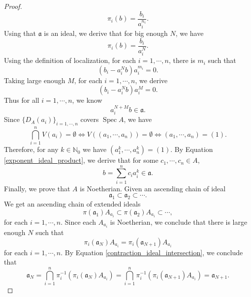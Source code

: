 \documentclass{article}
\numberwithin{equation}{section}
\DeclareMathOperator{\Spec}{Spec}
\begin{document}
\begin{proof}
\begin{equation*}
\pi_i(b) = {\frac {b_i} {a_i^{n_i}}}.
\end{equation*}
Using that $\mathfrak{a}$ is an ideal, we derive that for big enough $N$, we have
\begin{equation*}
\pi_i(b) = {\frac {b_i} {a_i^{N}}}.
\end{equation*}
Using the definition of localization, for each $i=1,\cdots,n$, there is $m_i$ such that
\begin{equation*}
(b_i-a_i^Nb)a_i^{m_i}=0.
\end{equation*}
Taking large enough $M$, for each $i=1,\cdots,n$, we derive
\begin{equation*}
(b_i-a_i^Nb)a_i^{M}=0.
\end{equation*}
Thus for all $i=1,\cdots,n$, we know
\begin{equation}
a_i^{N+M}b\in\mathfrak{a}.
\label{exponent_ideal_product}
\end{equation}
Since $\{D_A(a_i)\}_{i=1,\cdots,n}$ covers $\Spec A$, we have
\begin{equation*}
\bigcap_{i=1}^n V(a_i)=\emptyset\Leftrightarrow V((a_1,\cdots,a_n))=\emptyset\Leftrightarrow(a_1,\cdots,a_n) = (1).
\end{equation*}
Therefore, for any $k\in\mathbb{N}_0$ we have $(a_1^k,\cdots,a_n^k)=(1)$. By Equation \eqref{exponent_ideal_product}, we derive that for some $c_1,\cdots,c_n\in A$, %
\begin{equation*}
b=\sum_{i=1}^n c_ia_i^k\in\mathfrak{a}.
\end{equation*}
Finally, we prove that $A$ is Noetherian. Given an ascending chain of ideal
\begin{equation*}
\mathfrak{a}_1\subset\mathfrak{a}_2\subset\cdots.
\end{equation*}
We get an ascending chain of extended ideals
\begin{equation*}
\pi(\mathfrak{a}_1)A_{a_i}\subset\pi(\mathfrak{a}_2)A_{a_i}\subset\cdots,
\end{equation*}
for each $i=1,\cdots,n$. Since each $A_{a_i}$ is Noetherian, we conclude that there is large enough $N$ such that
\begin{equation*}
\pi_i(\mathfrak{a}_N)A_{a_i}=\pi_i(\mathfrak{a}_{N+1})A_{a_i}
\end{equation*}
for each $i=1,\cdots,n$. By Equation \eqref{contraction_ideal_intersection}, we conclude that
\begin{equation*}
\mathfrak{a}_N=\bigcap_{i=1}^n\pi_i^{-1}(\pi_i(\mathfrak{a}_N)A_{a_i})=\bigcap_{i=1}^n\pi_i^{-1}(\pi_i(\mathfrak{a}_{N+1})A_{a_i})=\mathfrak{a}_{N+1}.
\end{equation*}
\end{proof}
\end{document}
